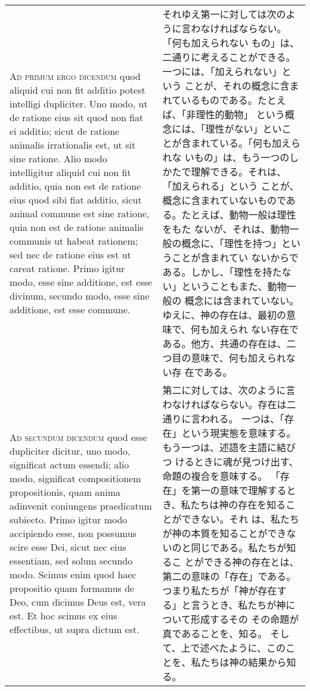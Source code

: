 \documentclass[10pt]{jsarticle} %
\begin{document}
\begin{longtable}{p{21em}p{21em}}
\\



\textsc{Ad primum ergo dicendum} quod aliquid cui non fit additio potest
 intelligi dupliciter.
Uno modo, ut de ratione eius sit quod non fiat ei additio; sicut de
 ratione animalis irrationalis est, ut sit sine ratione.
Alio modo intelligitur aliquid cui non fit additio, quia non est de
 ratione eius quod sibi fiat additio, sicut animal commune est sine
 ratione, quia non est de ratione animalis communis ut habeat rationem;
 sed nec de ratione eius est ut careat ratione.
Primo igitur modo, esse sine additione, est esse divinum, secundo modo,
 esse sine additione, est esse commune.

&

それゆえ第一に対しては次のように言わなければならない。「何も加えられない
 もの」は、二通りに考えることができる。一つには、「加えられない」という
 ことが、それの概念に含まれているものである。たとえば、「非理性的動物」
 という概念には、「理性がない」といことが含まれている。「何も加えられな
 いもの」は、もう一つのしかたで理解できる。それは、「加えられる」という
 ことが、概念に含まれていないものである。たとえば、動物一般は理性をもた
 ないが、それは、動物一般の概念に、「理性を持つ」ということが含まれてい
 ないからである。しかし、「理性を持たない」ということもまた、動物一般の
 概念には含まれていない。ゆえに、神の存在は、最初の意味で、何も加えられ
 ない存在である。他方、共通の存在は、二つ目の意味で、何も加えられない存
 在である。


\\

\textsc{Ad secundum dicendum} quod esse dupliciter dicitur, uno modo,
 significat actum essendi; alio modo, significat compositionem
 propositionis, quam anima adinvenit coniungens praedicatum subiecto.
Primo igitur modo accipiendo esse, non possumus scire esse Dei, sicut
 nec eius essentiam, sed solum secundo modo. Scimus enim quod haec
 propositio quam formamus de Deo, cum dicimus Deus est, vera est. Et hoc
 scimus ex eius effectibus, ut supra dictum est.


&

第二に対しては、次のように言わなければならない。存在は二通りに言われる。
 一つは、「存在」という現実態を意味する。もう一つは、述語を主語に結びつ
 けるときに魂が見つけ出す、命題の複合を意味する。
「存在」を第一の意味で理解するとき、私たちは神の存在を知ることができない。それ
 は、私たちが神の本質を知ることができないのと同じである。私たちが知るこ
 とができる神の存在とは、第二の意味の「存在」である。
つまり私たちが「神が存在する」と言うとき、私たちが神について形成するその
 その命題が真であることを、知る。
そして、上で述べたように、このことを、私たちは神の結果から知る。


\end{longtable}
\end{document}
